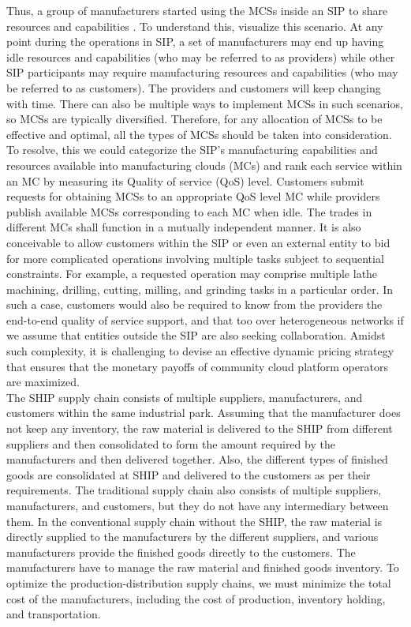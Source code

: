 \documentclass[paper=a4wide, fontsize=12pt]{scrartcl}	 %
\begin{document}
Thus, a group of manufacturers started using the MCSs inside an SIP to share resources and capabilities \cite{Kang2022}. To understand this, visualize this scenario. At any point during the operations in SIP, a set of manufacturers may end up having idle resources and capabilities (who may be referred to as providers) while other SIP participants may require manufacturing resources and capabilities (who may be referred to as customers). The providers and customers will keep changing with time. There can also be multiple ways to implement MCSs in such scenarios, so MCSs are typically diversified. Therefore, for any allocation of MCSs to be effective and optimal, all the types of MCSs should be taken into consideration. To resolve, this we could categorize the SIP's manufacturing capabilities and resources available into manufacturing clouds (MCs) and rank each service within an MC by measuring its Quality of service (QoS) level. Customers submit requests for obtaining MCSs to an appropriate QoS level MC while providers publish available MCSs corresponding to each MC when idle. The trades in different MCs shall function in a mutually independent manner. It is also conceivable to allow customers within the SIP or even an external entity to bid for more complicated operations involving multiple tasks subject to sequential constraints. For example, a requested operation may comprise multiple lathe machining, drilling, cutting, milling, and grinding tasks in a particular order. In such a case, customers would also be required to know from the providers the end-to-end quality of service support, and that too over heterogeneous networks if we assume that entities outside the SIP are also seeking collaboration. Amidst such complexity, it is challenging to devise an effective dynamic pricing strategy that ensures that the monetary payoffs of community cloud platform operators are maximized. \\

The SHIP supply chain consists of multiple suppliers, manufacturers, and customers within the same industrial park. Assuming that the manufacturer does not keep any inventory, the raw material is delivered to the SHIP from different suppliers and then consolidated to form the amount required by the manufacturers and then delivered together. Also, the different types of finished goods are consolidated at SHIP and delivered to the customers as per their requirements. The traditional supply chain also consists of multiple suppliers, manufacturers, and customers, but they do not have any intermediary between them. In the conventional supply chain without the SHIP, the raw material is directly supplied to the manufacturers by the different suppliers, and various manufacturers provide the finished goods directly to the customers. The manufacturers have to manage the raw material and finished goods inventory. To optimize the production-distribution supply chains, we must minimize the total cost of the manufacturers, including the cost of production, inventory holding, and transportation.
\end{document}
